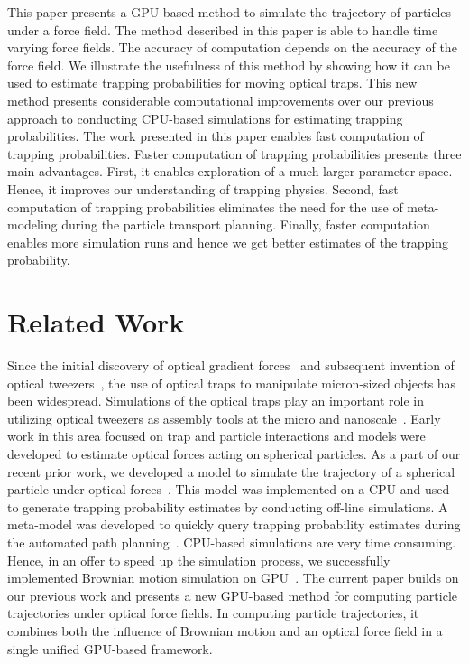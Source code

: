 \documentclass[twocolumn,10pt]{asme2ej}
\begin{document}
This paper presents a GPU-based method to simulate the trajectory of 
particles under a force field. The method described in this
paper is able to handle time varying force fields. The accuracy of
computation depends on the accuracy of the force field. We illustrate
the usefulness of this method by showing how it can be
used to estimate trapping probabilities for moving optical traps. This
new method presents considerable computational improvements over our
previous approach to conducting CPU-based simulations for estimating
trapping probabilities. The work presented in this paper enables fast
computation of trapping probabilities. Faster computation of trapping
probabilities presents three main advantages. First, it enables
exploration of a much larger parameter space. Hence, it improves our
understanding of trapping physics. Second, fast computation of
trapping probabilities eliminates the need for the use of
meta-modeling during the particle transport planning. Finally, faster
computation enables more simulation runs and hence we get better
estimates of the trapping probability.


\section{Related Work}

Since the initial discovery of optical gradient
forces~\cite{ashkin1970acceleration} and subsequent invention of
optical tweezers~\cite{ashkin1986observation}, the use of optical
traps to manipulate micron-sized objects has been widespread.
Simulations of the optical traps play an important role in utilizing
optical tweezers as assembly tools at the micro and nanoscale~\cite{Banerjee:2010:ieee}. Early work in this area focused on
trap and particle interactions and models were developed to estimate
optical forces acting on spherical particles. As a part of our recent
prior work, we developed a model to simulate the trajectory of a
spherical particle under optical forces~\cite{
  banerjee2009generating}. This model was implemented on a CPU and used
to generate trapping probability estimates by conducting off-line
simulations. A meta-model was developed to quickly query trapping
probability estimates during the automated path
planning~\cite{Banerjee:2010:ieee}. CPU-based simulations are very
time consuming. Hence, in an offer to speed up the simulation process,
we successfully implemented Brownian motion simulation on
GPU~\cite{balijepalli2010stochastic}. The current paper builds on our
previous work and presents a new GPU-based method for computing
particle trajectories under optical force fields. In computing
particle trajectories, it combines both the influence of Brownian
motion and an optical force field in a single unified GPU-based
framework.
\end{document}
